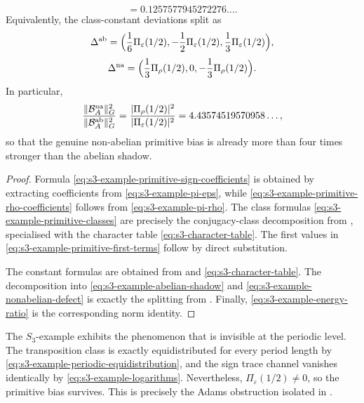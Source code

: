 \begin{corollary}
\begin{equation}
    =0.1257577945272276\ldots.
  \end{equation}
  Equivalently, the class-constant deviations split as
  \begin{equation}\label{eq:s3-example-abelian-shadow}
    \Delta^{\mathrm{ab}}
    =
    \Bigl(
      \frac16\Pi_\varepsilon(1/2),
      -\frac12\Pi_\varepsilon(1/2),
      \frac13\Pi_\varepsilon(1/2)
    \Bigr),
  \end{equation}
  \begin{equation}\label{eq:s3-example-nonabelian-defect}
    \Delta^{\mathrm{na}}
    =
    \Bigl(
      \frac13\Pi_\rho(1/2),
      0,
      -\frac13\Pi_\rho(1/2)
    \Bigr).
  \end{equation}
  In particular,
  \begin{equation}\label{eq:s3-example-energy-ratio}
    \frac{\lVert \mathcal B_A^{\mathrm{na}} \rVert_G^2}
         {\lVert \mathcal B_A^{\mathrm{ab}} \rVert_G^2}
    =
    \frac{\lvert \Pi_\rho(1/2) \rvert^2}
         {\lvert \Pi_\varepsilon(1/2) \rvert^2}
    =4.43574519570958\ldots,
  \end{equation}
  so that the genuine non-abelian primitive bias is already more than
  four times stronger than the abelian shadow.
\end{corollary}

\begin{proof}
  Formula \eqref{eq:s3-example-primitive-sign-coefficients} is obtained
  by extracting coefficients from \eqref{eq:s3-example-pi-eps}, while
  \eqref{eq:s3-example-primitive-rho-coefficients} follows from
  \eqref{eq:s3-example-pi-rho}. The class formulas
  \eqref{eq:s3-example-primitive-classes} are precisely the
  conjugacy-class decomposition from
  , specialised with the
  character table \eqref{eq:s3-character-table}. The first values in
  \eqref{eq:s3-example-primitive-first-terms} follow by direct
  substitution.

  The constant formulas are obtained from
   and
  \eqref{eq:s3-character-table}. The decomposition into
  \eqref{eq:s3-example-abelian-shadow} and
  \eqref{eq:s3-example-nonabelian-defect} is exactly the splitting from
  . Finally,
  \eqref{eq:s3-example-energy-ratio} is the corresponding norm identity.
\end{proof}

\begin{remark}
  The \(S_3\)-example exhibits the phenomenon that is invisible at the
  periodic level. The transposition class is exactly equidistributed for
  every period length by \eqref{eq:s3-example-periodic-equidistribution},
  and the sign trace channel vanishes identically by
  \eqref{eq:s3-example-logarithms}. Nevertheless,
  \(\Pi_\varepsilon(1/2)\neq 0\), so the primitive bias survives. This
  is precisely the Adams obstruction isolated in
  .
\end{remark}
